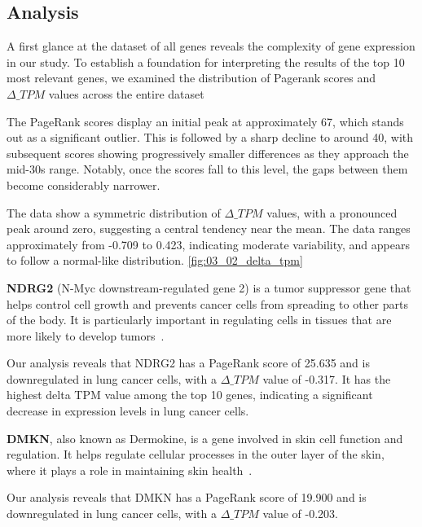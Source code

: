 \subsection{Analysis} \label{subsec:analysis}
A first glance at the dataset of all genes reveals the complexity of gene expression in our study.
To establish a foundation for interpreting the results of the top 10 most relevant genes,
we examined the distribution of Pagerank scores and $\Delta\_TPM$ values across the entire dataset

The PageRank scores display an initial peak at approximately 67, which stands out as a significant outlier.
This is followed by a sharp decline to around 40, with subsequent scores showing progressively smaller differences
as they approach the mid-30s range.
Notably, once the scores fall to this level, the gaps between them become considerably narrower.

The data show a symmetric distribution of $\Delta\_TPM$ values, with a pronounced peak around zero, suggesting a central tendency near the mean.
The data ranges approximately from -0.709 to 0.423, indicating moderate variability, and appears to follow a normal-like distribution.
\ref{fig:03_02_delta_tpm}
\newline


\textbf{NDRG2} (N-Myc downstream-regulated gene 2) is a tumor suppressor gene that helps control cell growth and
prevents cancer cells from spreading to other parts of the body.
It is particularly important in regulating cells in tissues that are more likely to develop tumors~\cite{Lee2022NDRG2}.

Our analysis reveals that NDRG2 has a PageRank score of 25.635 and is downregulated in lung cancer cells,
with a $\Delta\_TPM$ value of -0.317.
It has the highest delta TPM value among the top 10 genes, indicating a significant decrease in expression levels in lung cancer cells.
\newline

\textbf{DMKN}, also known as Dermokine, is a gene involved in skin cell function and regulation.
It helps regulate cellular processes in the outer layer of the skin, where it plays a role in maintaining skin health~\cite{Naso2007Deromokine}.

Our analysis reveals that DMKN has a PageRank score of 19.900 and is downregulated in lung cancer cells,
with a $\Delta\_TPM$ value of -0.203.

